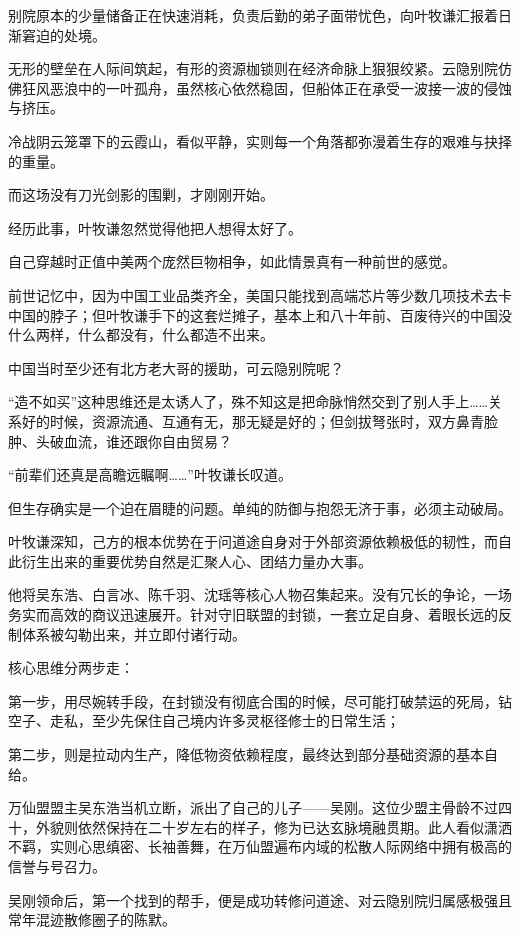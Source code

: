 别院原本的少量储备正在快速消耗，负责后勤的弟子面带忧色，向叶牧谦汇报着日渐窘迫的处境。

无形的壁垒在人际间筑起，有形的资源枷锁则在经济命脉上狠狠绞紧。云隐别院仿佛狂风恶浪中的一叶孤舟，虽然核心依然稳固，但船体正在承受一波接一波的侵蚀与挤压。

冷战阴云笼罩下的云霞山，看似平静，实则每一个角落都弥漫着生存的艰难与抉择的重量。

而这场没有刀光剑影的围剿，才刚刚开始。

\vspace{2em}

经历此事，叶牧谦忽然觉得他把人想得太好了。

自己穿越时正值中美两个庞然巨物相争，如此情景真有一种前世的感觉。

前世记忆中，因为中国工业品类齐全，美国只能找到高端芯片等少数几项技术去卡中国的脖子；但叶牧谦手下的这套烂摊子，基本上和八十年前、百废待兴的中国没什么两样，什么都没有，什么都造不出来。

中国当时至少还有北方老大哥的援助，可云隐别院呢？

“造不如买”这种思维还是太诱人了，殊不知这是把命脉悄然交到了别人手上……关系好的时候，资源流通、互通有无，那无疑是好的；但剑拔弩张时，双方鼻青脸肿、头破血流，谁还跟你自由贸易？

“前辈们还真是高瞻远瞩啊……”叶牧谦长叹道。

但生存确实是一个迫在眉睫的问题。单纯的防御与抱怨无济于事，必须主动破局。

叶牧谦深知，己方的根本优势在于问道途自身对于外部资源依赖极低的韧性，而自此衍生出来的重要优势自然是汇聚人心、团结力量办大事。

他将吴东浩、白言冰、陈千羽、沈瑶等核心人物召集起来。没有冗长的争论，一场务实而高效的商议迅速展开。针对守旧联盟的封锁，一套立足自身、着眼长远的反制体系被勾勒出来，并立即付诸行动。

核心思维分两步走：

第一步，用尽婉转手段，在封锁没有彻底合围的时候，尽可能打破禁运的死局，钻空子、走私，至少先保住自己境内许多灵枢径修士的日常生活；

第二步，则是拉动内生产，降低物资依赖程度，最终达到部分基础资源的基本自给。

万仙盟盟主吴东浩当机立断，派出了自己的儿子——吴刚。这位少盟主骨龄不过四十，外貌则依然保持在二十岁左右的样子，修为已达玄脉境融贯期。此人看似潇洒不羁，实则心思缜密、长袖善舞，在万仙盟遍布内域的松散人际网络中拥有极高的信誉与号召力。

吴刚领命后，第一个找到的帮手，便是成功转修问道途、对云隐别院归属感极强且常年混迹散修圈子的陈默。

